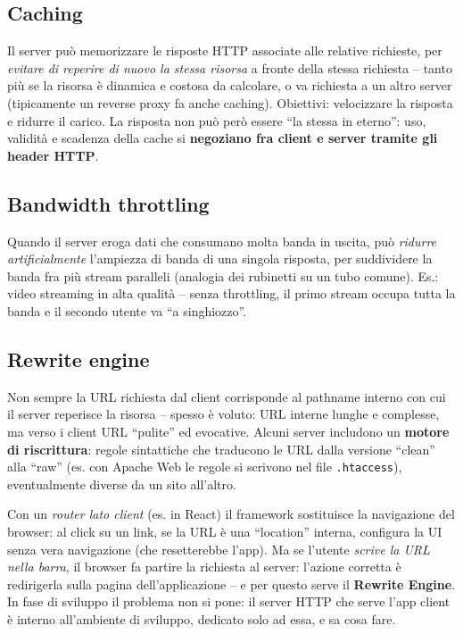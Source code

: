 \subsection{Caching}
Il server pu\`o memorizzare le risposte HTTP associate alle relative richieste, per
\emph{evitare di reperire di nuovo la stessa risorsa} a fronte della stessa richiesta --
tanto pi\`u se la risorsa \`e dinamica e costosa da calcolare, o va richiesta a un altro
server (tipicamente un reverse proxy fa anche caching). Obiettivi: velocizzare la risposta e
ridurre il carico. La risposta non pu\`o per\`o essere ``la stessa in eterno'': uso,
validit\`a e scadenza della cache si \textbf{negoziano fra client e server tramite gli header
HTTP}.

\subsection{Bandwidth throttling}
Quando il server eroga dati che consumano molta banda in uscita, pu\`o \emph{ridurre
artificialmente} l'ampiezza di banda di una singola risposta, per suddividere la banda fra
pi\`u stream paralleli (analogia dei rubinetti su un tubo comune). Es.: video streaming in
alta qualit\`a -- senza throttling, il primo stream occupa tutta la banda e il secondo utente
va ``a singhiozzo''.

\subsection{Rewrite engine}
Non sempre la URL richiesta dal client corrisponde al pathname interno con cui il server
reperisce la risorsa -- spesso \`e voluto: URL interne lunghe e complesse, ma verso i client
URL ``pulite'' ed evocative. Alcuni server includono un \textbf{motore di riscrittura}: regole
sintattiche che traducono le URL dalla versione ``clean'' alla ``raw'' (es. con Apache Web le
regole si scrivono nel file \texttt{.htaccess}), eventualmente diverse da un sito all'altro.
\begin{importante}
Con un \emph{router lato client} (es. in React) il framework sostituisce la navigazione del
browser: al click su un link, se la URL \`e una ``location'' interna, configura la UI senza
vera navigazione (che resetterebbe l'app). Ma se l'utente \emph{scrive la URL nella barra},
il browser fa partire la richiesta al server: l'azione corretta \`e redirigerla sulla pagina
dell'applicazione -- e per questo serve il \textbf{Rewrite Engine}. In fase di sviluppo il
problema non si pone: il server HTTP che serve l'app client \`e interno all'ambiente di
sviluppo, dedicato solo ad essa, e sa cosa fare.
\end{importante}

